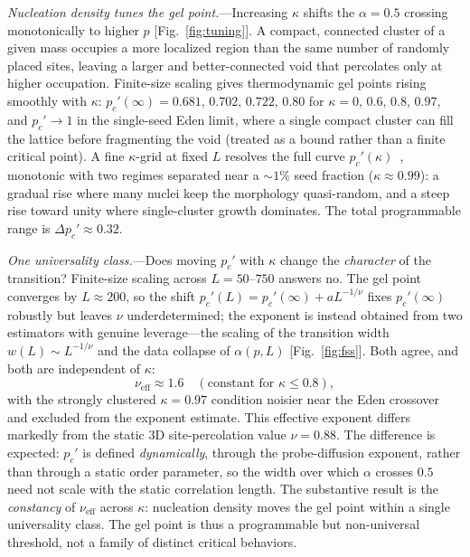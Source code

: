 \documentclass[aps,prl,twocolumn,superscriptaddress,floatfix,nofootinbib]{revtex4-2}
\newcommand{\pcp}{p_c'}
\newcommand{\kap}{\kappa}
\newcommand{\nueff}{\nu_{\mathrm{eff}}}
\begin{document}
\emph{Nucleation density tunes the gel point.}---Increasing $\kap$ shifts the $\alpha=0.5$ crossing monotonically to higher $p$ [Fig.~\ref{fig:tuning}]. A compact, connected cluster of a given mass occupies a more localized region than the same number of randomly placed sites, leaving a larger and better-connected void that percolates only at higher occupation. Finite-size scaling gives thermodynamic gel points rising smoothly with $\kap$: $\pcp(\infty)=0.681,\,0.702,\,0.722,\,0.80$ for $\kap=0,\,0.6,\,0.8,\,0.97$, and $\pcp\to1$ in the single-seed Eden limit, where a single compact cluster can fill the lattice before fragmenting the void (treated as a bound rather than a finite critical point). A fine $\kap$-grid at fixed $L$ resolves the full curve $\pcp(\kap)$~\cite{SM}, monotonic with two regimes separated near a $\sim1\%$ seed fraction ($\kap\approx0.99$): a gradual rise where many nuclei keep the morphology quasi-random, and a steep rise toward unity where single-cluster growth dominates. The total programmable range is $\Delta\pcp\approx0.32$.

\emph{One universality class.}---Does moving $\pcp$ with $\kap$ change the \emph{character} of the transition? Finite-size scaling across $L=50$--$750$ answers no. The gel point converges by $L\approx200$, so the shift $\pcp(L)=\pcp(\infty)+aL^{-1/\nu}$ fixes $\pcp(\infty)$ robustly but leaves $\nu$ underdetermined; the exponent is instead obtained from two estimators with genuine leverage---the scaling of the transition width $w(L)\sim L^{-1/\nu}$ and the data collapse of $\alpha(p,L)$ [Fig.~\ref{fig:fss}]. Both agree, and both are independent of $\kap$:
\begin{equation}
  \nueff \approx 1.6 \quad (\text{constant for } \kap\le0.8),
\end{equation}
with the strongly clustered $\kap=0.97$ condition noisier near the Eden crossover and excluded from the exponent estimate. This effective exponent differs markedly from the static 3D site-percolation value $\nu=0.88$. The difference is expected: $\pcp$ is defined \emph{dynamically}, through the probe-diffusion exponent, rather than through a static order parameter, so the width over which $\alpha$ crosses $0.5$ need not scale with the static correlation length. The substantive result is the \emph{constancy} of $\nueff$ across $\kap$: nucleation density moves the gel point within a single universality class. The gel point is thus a programmable but non-universal threshold, not a family of distinct critical behaviors.
\end{document}
